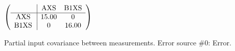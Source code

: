 \begin{table}[H]
\scriptsize
\begin{center}
\renewcommand{\arraystretch}{1.1}
\begin{math}\left(\begin{array}{c|cc}
 & \mathrm{AXS} & 
\mathrm{B1XS} \\
\hline
\mathrm{AXS} \hspace*{2pt} &      15.00 &  0 \\
\mathrm{B1XS} \hspace*{2pt} &  0 &      16.00 \\
\end{array}\right)\end{math}
\caption{Partial input covariance between measurements. Error source \#0: Error.}
\renewcommand{\arraystretch}{1}
\end{center}
\end{table}
\clearpage
